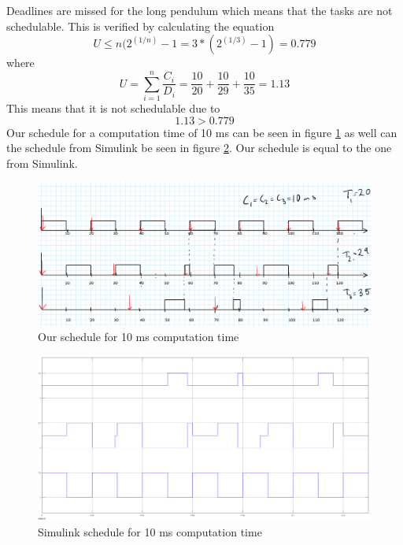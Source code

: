 \documentclass[12pt,a4paper]{article}
\begin{document}
    
Deadlines are missed for the long pendulum which means that the tasks
are not schedulable. This is verified by calculating the equation
\begin{equation}
 U \le n(2^{(1/n)}-1 = 3*(2^{(1/3)}-1) = 0.779
\end{equation}
where
\begin{equation}
U = \sum\limits_{i=1}^n \frac{C_i}{D_i} = \frac{10}{20}+\frac{10}{29}+\frac{10}{35} = 1.13
\end{equation}
This means that it is not schedulable due to
\begin{equation}
1.13 > 0.779
\end{equation} 
Our schedule for a computation time of 10 ms can be seen in figure
\ref{fig:ex541} as well can the schedule from Simulink be seen in figure
\ref{fig:ex542}. Our schedule is equal to the one from Simulink.
\begin{center}
	\begin{figure}[H]
      \centering
	\includegraphics[scale=0.3]{ex541.png}
	\caption{Our schedule for 10 ms computation time}
	\label{fig:ex541}
	\end{figure}
\end{center}
\begin{center}
	\begin{figure}[H]
      \centering
	\includegraphics[scale=0.2]{ex542.png}
	\caption{Simulink schedule for 10 ms computation time}
	\label{fig:ex542}
	\end{figure}
\end{center}
\end{document}
